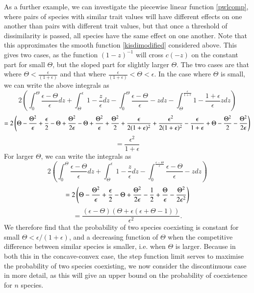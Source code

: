 As a further example, we can investigate the piecewise linear function \eqref{pwlcomp}, where pairs of species with similar trait values will have different effects on one another than pairs with different trait values, but that once a threshold of dissimilarity is passed, all species have the same effect on one another.  Note that this approximates the smooth function \eqref{kisdimodified} considered above. This gives two cases, as the function $(1-z)^{-1}$ will cross $c(-z)$ on the constant part for small $\Theta$, but the sloped part for slightly larger $\Theta$. The two cases are  that where $\Theta<\frac{\epsilon}{(1+\epsilon)}$ and that where $\frac{\epsilon}{(1+\epsilon)}<\Theta<\epsilon$. In the case where $\Theta$ is small, we can write the above integrals as
\[
2\left(\int_0^\Theta \frac{\epsilon-\Theta}{\epsilon}dz + \int_\Theta^{\epsilon} 1-\frac{z}{\epsilon}dz-\int_0^\Theta \frac{\epsilon-\Theta}{\epsilon}-z dz -\int_\Theta^{\frac{\epsilon}{1+\epsilon}} 1-\frac{1+\epsilon}{\epsilon}z dz\right)\]
\[= 2\left(\Theta-\frac{\Theta^2}{\epsilon}+\frac{\epsilon}{2}-\Theta+\frac{\Theta^2}{2\epsilon}-\Theta+\frac{\Theta^2}{\epsilon}+\frac{\Theta^2}{2}+\frac{\epsilon}{2(1+\epsilon)^2}+\frac{\epsilon^2}{2(1+\epsilon)^2}-\frac{\epsilon}{1+\epsilon}+\Theta-\frac{\Theta^2}{2}-\frac{\Theta^2}{2\epsilon}\right)\notag
\]
\[=\frac{\epsilon^2}{1+\epsilon}\]
For larger $\Theta$, we can write the integrals as
\[
2\left(\int_0^\Theta \frac{\epsilon-\Theta}{\epsilon}dz + \int_\Theta^{\epsilon} 1-\frac{z}{\epsilon}dz-\int_0^{\frac{\epsilon-\Theta}{\epsilon}} \frac{\epsilon-\Theta}{\epsilon}-z dz\right) \]
\[=2\left(\Theta-\frac{\Theta^2}{\epsilon}+\frac{\epsilon}{2}-\Theta+\frac{\Theta^2}{2\epsilon}-\frac{1}{2}+\frac{\Theta}{\epsilon}-\frac{\Theta^2}{2\epsilon^2}\right)\notag 
\]
\[
=\frac{(\epsilon-\Theta)(\Theta+\epsilon(\epsilon+\Theta-1))}{\epsilon^2}.
\]
We therefore find that the probability of two species coexisting is constant for small $\Theta<\epsilon/(1+\epsilon)$, and a decreasing function of $\Theta$ when the competitive difference between similar species is smaller, i.e. when $\Theta$ is larger. Because in both this in the concave-convex case, the step function limit serves to maximise the probability of two species coexisting, we now consider the discontinuous case in more detail, as this will give an upper bound on the probability of coexistence for $n$ species.

